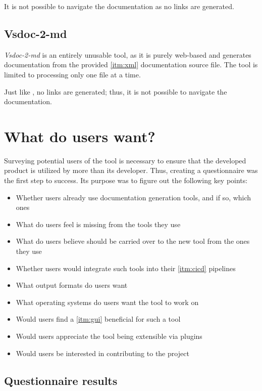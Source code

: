 It is not possible to navigate the documentation as no links are generated.

\subsection{Vsdoc-2-md}

\textit{Vsdoc-2-md} is an entirely unusable tool, as it is purely web-based and generates documentation from the provided \ref{itm:xml} documentation source file. The tool is limited to processing only one file at a time.

Just like \textit{}, no links are generated; thus, it is not possible to navigate the documentation.

\newpage

\section{What do users want?} \label{sec:whatdouserswant}
Surveying potential users of the tool is necessary to ensure that the developed product is utilized by more than its developer.
Thus, creating a questionnaire was the first step to success. Its purpose was to figure out the following key points:
\begin{itemize}
    \item Whether users already use documentation generation tools, and if so, which ones
    \item What do users feel is missing from the tools they use
    \item What do users believe should be carried over to the new tool from the ones they use
    \item Whether users would integrate such tools into their \ref{itm:cicd} pipelines
    \item What output formats do users want
    \item What operating systems do users want the tool to work on
    \item Would users find a \ref{itm:gui} beneficial for such a tool
    \item Would users appreciate the tool being extensible via plugins
    \item Would users be interested in contributing to the project
\end{itemize}

\subsection{Questionnaire results}

